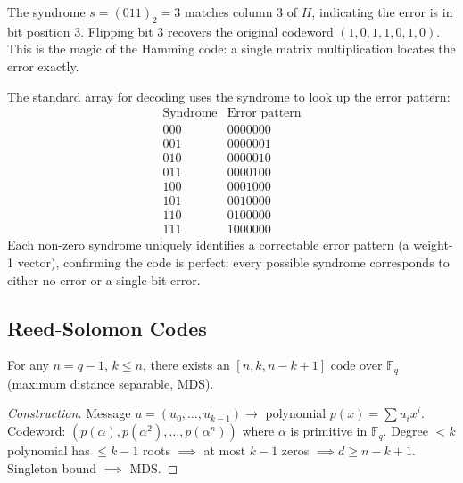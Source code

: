 \begin{example}
The syndrome $s = (011)_2 = 3$ matches column 3 of $H$, indicating the error is in bit position 3. Flipping bit 3 recovers the original codeword $(1,0,1,1,0,1,0)$. This is the magic of the Hamming code: a single matrix multiplication locates the error exactly.

The standard array for decoding uses the syndrome to look up the error pattern:
\[
\begin{array}{c|c}
\text{Syndrome} & \text{Error pattern} \\ \hline
000 & 0000000 \\
001 & 0000001 \\
010 & 0000010 \\
011 & 0000100 \\
100 & 0001000 \\
101 & 0010000 \\
110 & 0100000 \\
111 & 1000000
\end{array}
\]
Each non-zero syndrome uniquely identifies a correctable error pattern (a weight-1 vector), confirming the code is perfect: every possible syndrome corresponds to either no error or a single-bit error.
\end{example}

\subsection{Reed-Solomon Codes}
\label{sec:ec:rs}

\begin{theorem}
For any $n = q-1$, $k \le n$, there exists an $[n, k, n-k+1]$ code over $\mathbb{F}_q$ (maximum distance separable, MDS).
\end{theorem}

\begin{proof}[Construction]
Message $u = (u_0, \dots, u_{k-1}) \to$ polynomial $p(x) = \sum u_i x^i$. Codeword: $(p(\alpha), p(\alpha^2), \dots, p(\alpha^n))$ where $\alpha$ is primitive in $\mathbb{F}_q$. Degree $< k$ polynomial has $\le k-1$ roots $\implies$ at most $k-1$ zeros $\implies d \ge n-k+1$. Singleton bound $\implies$ MDS.
\end{proof}

